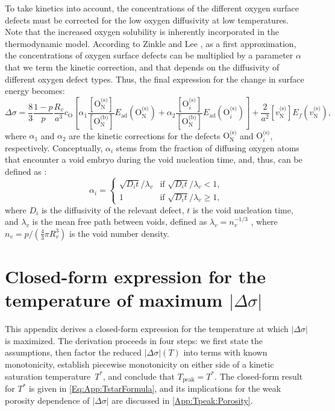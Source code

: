 \documentclass[preprint,12pt,sort&compress]{elsarticle}
\newcommand{\?}{\stackrel{?}{=}}
\begin{document}
To take kinetics into account, the concentrations of the different oxygen surface defects must be corrected for the low oxygen diffusivity at low temperatures. Note that the increased oxygen solubility is inherently incorporated in the thermodynamic model. According to Zinkle and Lee \cite{Zinkle1990}, as a first approximation, the concentrations of oxygen surface defects can be multiplied by a parameter $\alpha$ that we term the kinetic correction, and that depends on the diffusivity of different oxygen defect types. Thus, the final expression for the change in surface energy becomes:
\begin{equation}
\Delta \sigma = \frac{8}{3} \frac{1-p}{p} \frac{R_v}{a^3} c_\text{O} \left[ \alpha_1 \frac{ [ \text{O}_\text{N}^{\text{(s)}} ] }{ [ \text{O}_\text{N}^{\text{(b)}} ] }  E_\text{ad}( \text{O}_\text{N}^{\text{(s)}} ) + \alpha_2 \frac{ [ \text{O}_i^{\text{(s)}} ] }{ [ \text{O}_\text{N}^{\text{(b)}} ] }  E_\text{ad}( \text{O}_i^{\text{(s)}} ) \right] + \frac{2}{a^2} [ v_\text{N}^{\text{(s)}} ] E_f ( v_\text{N}^{\text{(s)}} ),
\end{equation}
where $\alpha_1$ and $\alpha_2$ are the kinetic corrections for the defects $\text{O}_\text{N}^\text{(s)}$ and $\text{O}_i^{\text{(s)}}$, respectively. Conceptually, $\alpha_i$ stems from the fraction of diffusing oxygen atoms that encounter a void embryo during the void nucleation time, and, thus, can be defined as \cite{Zinkle1990}:
\begin{equation}
\alpha_i =
\begin{cases}
    \sqrt{D_i t}/\lambda_v & \text{if } \sqrt{D_i t}/\lambda_v < 1, \\
    1 & \text{if } \sqrt{D_i t}/\lambda_v \geq 1,
\end{cases}    
\end{equation}
where $D_i$ is the diffusivity of the relevant defect, $t$ is the void nucleation time, and $\lambda_v$ is the mean free path between voids, defined as $\lambda_v = n_v^{-1/3}$ \cite{Olander2021}, where $n_v = p / ( \frac{4}{3} \pi R_v^3 ) $ is the void number density.

\FloatBarrier

\section{Closed-form expression for the temperature of maximum $|\Delta \sigma|$}
\label{App:Tpeak}

This appendix derives a closed-form expression for the temperature at which $|\Delta \sigma|$ is maximized. The derivation proceeds in four steps: we first state the assumptions, then factor the reduced $|\Delta \sigma|(T)$ into terms with known monotonicity, establish piecewise monotonicity on either side of a kinetic saturation temperature~$T^*$, and conclude that $T_\text{peak} = T^*$. The closed-form result for $T^*$ is given in \cref{Eq:App:TstarFormula}, and its implications for the weak porosity dependence of $|\Delta \sigma|$ are discussed in \ref{App:Tpeak:Porosity}.
\end{document}
